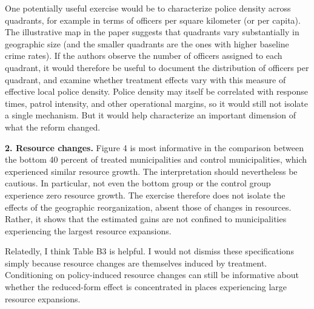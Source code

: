 \begin{bibunit}
\begin{refcomment}
One potentially useful exercise would be to characterize police density across quadrants, for example in terms of officers per square kilometer (or per capita). The illustrative map in the paper suggests that quadrants vary substantially in geographic size (and the smaller quadrants are the ones with higher baseline crime rates). If the authors observe the number of officers assigned to each quadrant, it would therefore be useful to document the distribution of officers per quadrant, and examine whether treatment effects vary with this measure of effective local police density. Police density may itself be correlated with response times, patrol intensity, and other operational margins, so it would still not isolate a single mechanism. But it would help characterize an important dimension of what the reform changed.

\label{pt:r1_01}
\end{refcomment}

\begin{response}
	
\end{response}



\begin{refcomment}
\smallskip

\textbf{2. Resource changes.} Figure 4 is most informative in the comparison between the bottom 40 percent of treated municipalities and control municipalities, which experienced similar resource growth. The interpretation should nevertheless be cautious. In particular, not even the bottom group or the control group experience zero resource growth. The exercise therefore does not isolate the effects of the geographic reorganization, absent those of changes in resources. Rather, it shows that the estimated gains are not confined to municipalities experiencing the largest resource expansions.

Relatedly, I think Table B3 is helpful. I would not dismiss these specifications simply because resource changes are themselves induced by treatment. Conditioning on policy-induced resource changes can still be informative about whether the reduced-form effect is concentrated in places experiencing large resource expansions.

\label{pt:r1_02}
\end{refcomment}

\begin{response}
	
\end{response}



\end{bibunit}
